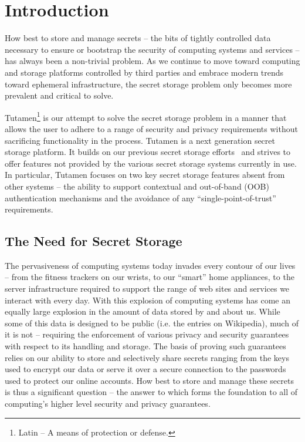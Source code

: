 \section{Introduction}
\label{sec:intro}

How best to store and manage secrets -- the bits of tightly controlled
data necessary to ensure or bootstrap the security of computing
systems and services -- has always been a non-trivial problem. As we
continue to move toward computing and storage platforms controlled by
third parties and embrace modern trends toward ephemeral
infrastructure, the secret storage problem only becomes more prevalent
and critical to solve.

Tutamen\footnote{Latin -- A means of protection or defense.} is our
attempt to solve the secret storage problem in a manner that allows
the user to adhere to a range of security and privacy requirements
without sacrificing functionality in the process. Tutamen is a next
generation secret storage platform. It builds on our previous secret
storage efforts~\cite{custos-trios} and strives to offer features not
provided by the various secret storage systems currently in use. In
particular, Tutamen focuses on two key secret storage features absent
from other systems -- the ability to support contextual and
out-of-band (OOB) authentication mechanisms and the avoidance of any
``single-point-of-trust'' requirements.

\subsection{The Need for Secret Storage}

The pervasiveness of computing systems today invades every contour of
our lives -- from the fitness trackers on our wrists, to our ``smart''
home appliances, to the server infrastructure required to support the
range of web sites and services we interact with every day. With this
explosion of computing systems has come an equally large explosion in
the amount of data stored by and about us. While some of this data is
designed to be public (i.e. the entries on Wikipedia), much of it is
not -- requiring the enforcement of various privacy and security
guarantees with respect to its handling and storage. The basis of
proving such guarantees relies on our ability to store and selectively
share secrets ranging from the keys used to encrypt our data or serve
it over a secure connection to the passwords used to protect our
online accounts. How best to store and manage these secrets is thus a
significant question -- the answer to which forms the foundation to
all of computing's higher level security and privacy
guarantees.

